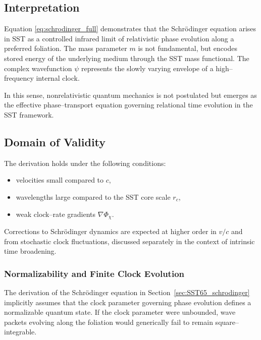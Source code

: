 \documentclass[11pt]{article}
\begin{document}
        \subsection{Interpretation}

            Equation \eqref{eq:schrodinger_full} demonstrates that the Schr\"odinger equation arises in SST as a controlled infrared limit of relativistic phase evolution along a preferred foliation. The mass parameter $m$ is not fundamental, but encodes stored energy of the underlying medium through the SST mass functional. The complex wavefunction $\psi$ represents the slowly varying envelope of a high--frequency internal clock.

            In this sense, nonrelativistic quantum mechanics is not postulated but emerges as the effective phase--transport equation governing relational time evolution in the SST framework.

        \subsection{Domain of Validity}

            The derivation holds under the following conditions:
            \begin{itemize}
                \item velocities small compared to $c$,
                \item wavelengths large compared to the SST core scale $r_c$,
                \item weak clock--rate gradients $\nabla \Phi_\chi$.
            \end{itemize}
            Corrections to Schr\"odinger dynamics are expected at higher order in $v/c$ and from stochastic clock fluctuations, discussed separately in the context of intrinsic time broadening.

            \subsubsection{Normalizability and Finite Clock Evolution}
                \label{sec:SST65_schrodinger_normalizability}

                The derivation of the Schr\"odinger equation in
                Section~\ref{sec:SST65_schrodinger} implicitly assumes that the clock parameter
                governing phase evolution defines a normalizable quantum state.
                If the clock parameter were unbounded, wave packets evolving along the
                foliation would generically fail to remain square--integrable.
\end{document}
